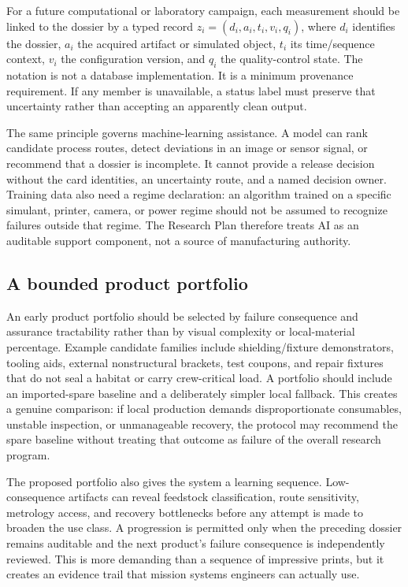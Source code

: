 \documentclass[conference]{../../../../Conference-LaTeX-template_10-17-19/IEEEtran}
\begin{document}
For a future computational or laboratory campaign, each measurement should be linked to the dossier by a typed record $z_i=(d_i, a_i, t_i, v_i, q_i)$, where $d_i$ identifies the dossier, $a_i$ the acquired artifact or simulated object, $t_i$ its time/sequence context, $v_i$ the configuration version, and $q_i$ the quality-control state. The notation is not a database implementation. It is a minimum provenance requirement. If any member is unavailable, a status label must preserve that uncertainty rather than accepting an apparently clean output.

The same principle governs machine-learning assistance. A model can rank candidate process routes, detect deviations in an image or sensor signal, or recommend that a dossier is incomplete. It cannot provide a release decision without the card identities, an uncertainty route, and a named decision owner. Training data also need a regime declaration: an algorithm trained on a specific simulant, printer, camera, or power regime should not be assumed to recognize failures outside that regime. The Research Plan therefore treats AI as an auditable support component, not a source of manufacturing authority.

\subsection{A bounded product portfolio}
An early product portfolio should be selected by failure consequence and assurance tractability rather than by visual complexity or local-material percentage. Example candidate families include shielding/fixture demonstrators, tooling aids, external nonstructural brackets, test coupons, and repair fixtures that do not seal a habitat or carry crew-critical load. A portfolio should include an imported-spare baseline and a deliberately simpler local fallback. This creates a genuine comparison: if local production demands disproportionate consumables, unstable inspection, or unmanageable recovery, the protocol may recommend the spare baseline without treating that outcome as failure of the overall research program.

The proposed portfolio also gives the system a learning sequence. Low-consequence artifacts can reveal feedstock classification, route sensitivity, metrology access, and recovery bottlenecks before any attempt is made to broaden the use class. A progression is permitted only when the preceding dossier remains auditable and the next product's failure consequence is independently reviewed. This is more demanding than a sequence of impressive prints, but it creates an evidence trail that mission systems engineers can actually use.
\end{document}
